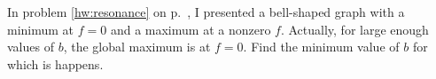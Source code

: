 In problem \ref{hw:resonance} on p.~\pageref{hw:resonance}, I presented a bell-shaped
graph with a minimum at $f=0$ and a maximum at a nonzero $f$. Actually, for large enough values of $b$, the
global maximum is at $f=0$. Find the minimum value of $b$ for which is happens.\answercheck
